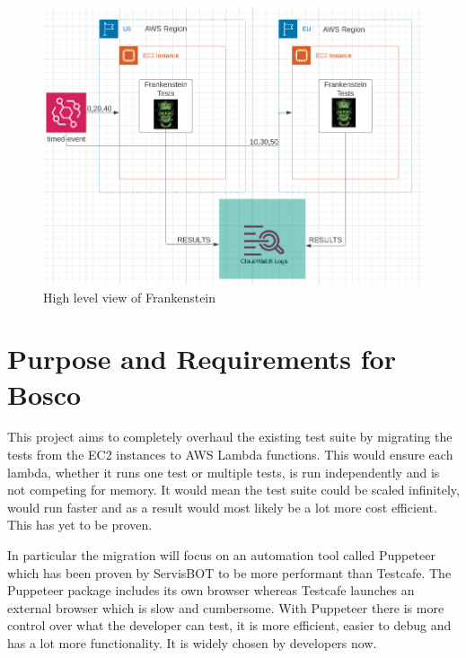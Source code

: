\documentclass[12pt,a4paper,titlepage]{report}
\begin{document}
 \begin{figure}[ht]
  \centering
  \includegraphics[width=\textwidth,height=\textheight,keepaspectratio]{./diagrams/frank_high_level.png}
  \caption{High level view of Frankenstein}
 \end{figure}
 \clearpage

\section{Purpose and Requirements for Bosco}

This project aims to completely overhaul the existing test suite by migrating the tests from the EC2 instances to AWS Lambda functions. This would ensure each lambda, whether it runs one test or multiple tests, is run independently and is not competing for memory. It would mean the test suite could be scaled infinitely, would run faster and as a result would most likely be a lot more cost efficient. This has yet to be proven.

In particular the migration will focus on an automation tool called Puppeteer which has been proven by ServisBOT to be more performant than Testcafe. The Puppeteer package includes its own browser whereas Testcafe launches an external browser which is slow and cumbersome. With Puppeteer there is more control over what the developer can test, it is more efficient, easier to debug and has a lot more functionality. It is widely chosen by developers now.
\end{document}
